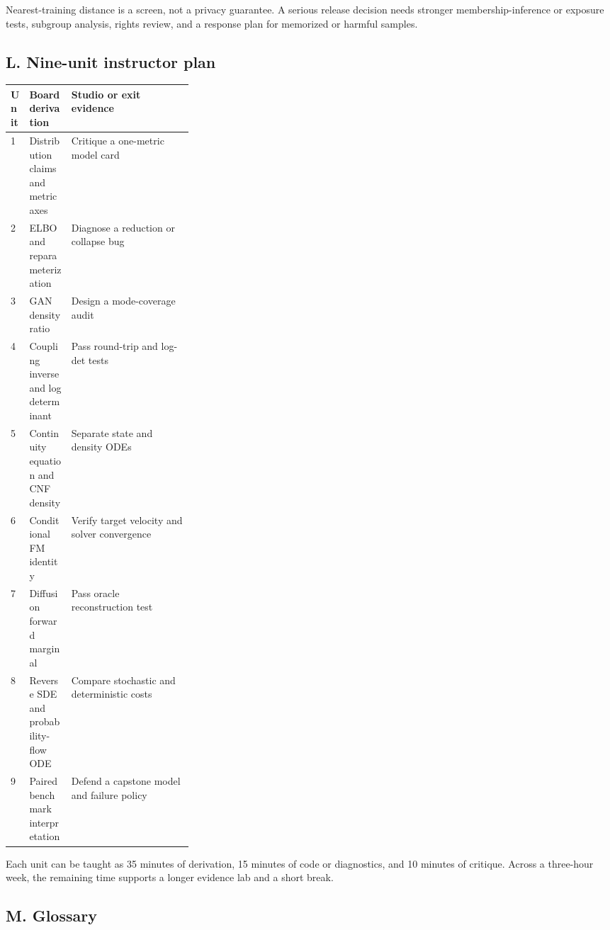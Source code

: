 \documentclass[11pt]{article}
\begin{document}
Nearest-training distance is a screen, not a privacy guarantee. A serious release
decision needs stronger membership-inference or exposure tests, subgroup analysis,
rights review, and a response plan for memorized or harmful samples.

\subsection*{L. Nine-unit instructor plan}

\begin{center}
\small
\begin{tabularx}{\linewidth}{p{0.07\linewidth}p{0.23\linewidth}X}
\toprule
Unit & Board derivation & Studio or exit evidence \\
\midrule
1 & Distribution claims and metric axes & Critique a one-metric model card \\
2 & ELBO and reparameterization & Diagnose a reduction or collapse bug \\
3 & GAN density ratio & Design a mode-coverage audit \\
4 & Coupling inverse and log determinant & Pass round-trip and log-det tests \\
5 & Continuity equation and CNF density & Separate state and density ODEs \\
6 & Conditional FM identity & Verify target velocity and solver convergence \\
7 & Diffusion forward marginal & Pass oracle reconstruction test \\
8 & Reverse SDE and probability-flow ODE & Compare stochastic and deterministic costs \\
9 & Paired benchmark interpretation & Defend a capstone model and failure policy \\
\bottomrule
\end{tabularx}
\end{center}

Each unit can be taught as 35 minutes of derivation, 15 minutes of code or
diagnostics, and 10 minutes of critique. Across a three-hour week, the remaining
time supports a longer evidence lab and a short break.

\subsection*{M. Glossary}
\end{document}
